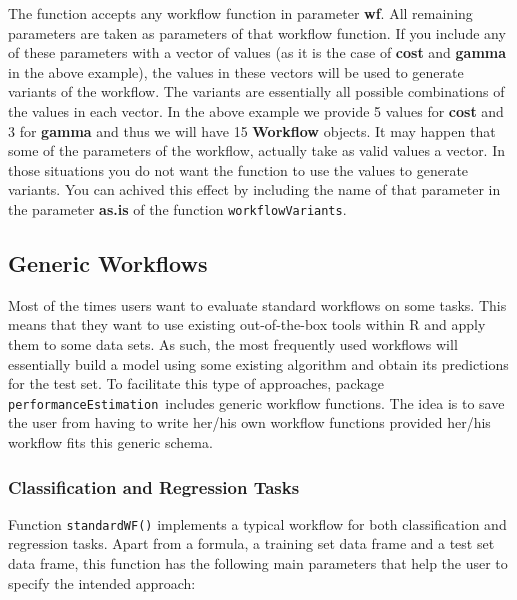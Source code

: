 \documentclass[10pt,a4paper]{article}\usepackage[]{graphicx}\usepackage[]{color}
\newcommand{\PE}{package \texttt{performanceEstimation}\ }
\begin{document}
The function accepts any workflow function in parameter
\textbf{wf}. All remaining parameters are taken as parameters of that
workflow function. If you include  any of these parameters with a vector of values
(as it is the case of \textbf{cost} and \textbf{gamma} in the above
example), the values in these vectors will be used to generate
variants of the workflow. The variants are essentially all possible
combinations of the values in each vector. In the above example we
provide 5 values for \textbf{cost} and 3 for \textbf{gamma} and thus
we will have 15 \textbf{Workflow} objects. It may happen that some of
the parameters of the workflow, actually take as valid values a
vector. In those situations you do not want the function to use the
values to generate variants. You can achived this effect by including
the name of that parameter in the parameter \textbf{as.is} of the
function \texttt{workflowVariants}.


\subsection{Generic Workflows}

Most of the times users want to evaluate standard workflows on some tasks. This means that they want to use existing out-of-the-box tools within R and apply them to some data sets.  As such, 
the most frequently used workflows will essentially build a model
using some existing algorithm and obtain its predictions for the test set. To facilitate this type of approaches, \PE includes generic workflow functions. The idea is to save the user
from having to write her/his own workflow functions provided her/his workflow fits
this generic schema.

\subsubsection{Classification and Regression Tasks}\label{sec:standardWF}

Function \texttt{standardWF()} implements a typical workflow for both
classification and regression tasks. Apart from a formula, a training set data frame and a test set data frame, this function has the following main parameters that help the user to specify the intended approach:
\end{document}
